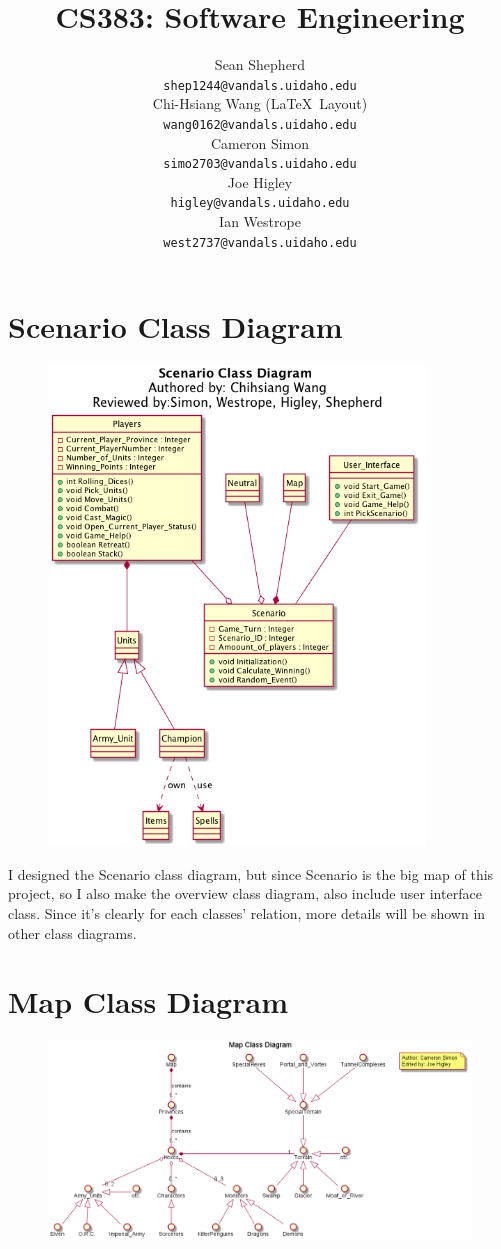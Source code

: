 \documentclass[12pt,letterpaper]{scrreprt}
\title{CS383: Software Engineering}
\author{
			Sean Shepherd\\
			\texttt{shep1244@vandals.uidaho.edu}
			\\
			Chi-Hsiang Wang (\LaTeX\ Layout)\\
			\texttt{wang0162@vandals.uidaho.edu}								
			\\
			Cameron Simon\\
			\texttt{simo2703@vandals.uidaho.edu}					
			\\
			Joe Higley\\
			\texttt{higley@vandals.uidaho.edu}				
			\\
			Ian Westrope\\
			\texttt{west2737@vandals.uidaho.edu}
			\\
}
\date{}
\begin{document}
\maketitle

\chapter {Scenario Class Diagram}
\begin{figure}[ht!]
\centering
\includegraphics[width=100mm]{Scenario Class Diagram.png}

\end{figure}

I designed the Scenario class diagram, but since Scenario is the big map of this project, so I also make the overview class diagram, also include user interface class. Since it's clearly for each classes' relation, more details will be shown in other class diagrams.




\chapter {Map Class Diagram}


\begin{figure}[ht!]
\centering
\includegraphics[width=170mm]{Map Class Diagram.png}
\label{overflow}
\end{figure}
\end{document}
